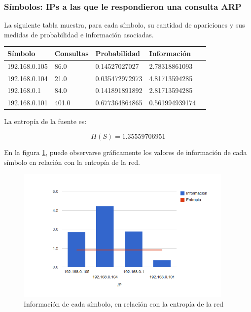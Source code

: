 \documentclass{article}
\begin{document}
\subsubsection{Símbolos: IPs a las que le respondieron una consulta ARP}
La siguiente tabla muestra, para cada símbolo, su cantidad de apariciones y
sus medidas de probabilidad e información asociadas.

\vskip10pt

\begin{tabular}{|l|l|l|l|l|}
  \hline
  Símbolo & Consultas & Probabilidad & Información \\
  \hline
  192.168.0.105 & 86.0 & 0.14527027027 & 2.78318861093\\
  \hline
  192.168.0.104 & 21.0 & 0.035472972973 & 4.81713594285\\
  \hline
  192.168.0.1 & 84.0 & 0.141891891892 & 2.81713594285\\
  \hline
  192.168.0.101 & 401.0 & 0.677364864865 & 0.561994939174\\
  \hline

\end{tabular}

\vskip10pt

La entropía de la fuente es:

$$H(S) = 1.35559706951$$

En la figura \ref{fig:red1replied:infoentro}, puede observarse gráficamente
los valores de información de cada símbolo en relación con la entropía de la
red.

\begin{figure}[h!]
    \centering                                                       
    \includegraphics[width=300pt]{respondidas1.png}
    \caption{Información de cada símbolo, en relación con la
        entropía de la red}
    \label{fig:red1replied:infoentro}
\end{figure}
\end{document}
